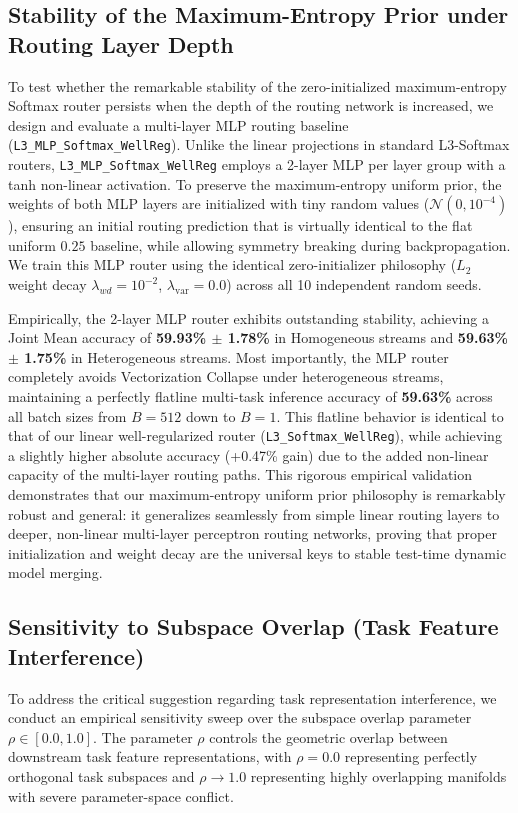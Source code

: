 \subsection{Stability of the Maximum-Entropy Prior under Routing Layer Depth}
\label{subsec:mlp_depth}
To test whether the remarkable stability of the zero-initialized maximum-entropy Softmax router persists when the depth of the routing network is increased, we design and evaluate a multi-layer MLP routing baseline (\texttt{L3\_MLP\_Softmax\_WellReg}). Unlike the linear projections in standard L3-Softmax routers, \texttt{L3\_MLP\_Softmax\_WellReg} employs a 2-layer MLP per layer group with a tanh non-linear activation. To preserve the maximum-entropy uniform prior, the weights of both MLP layers are initialized with tiny random values ($\mathcal{N}(0, 10^{-4})$), ensuring an initial routing prediction that is virtually identical to the flat uniform $0.25$ baseline, while allowing symmetry breaking during backpropagation. We train this MLP router using the identical zero-initializer philosophy ($L_2$ weight decay $\lambda_{wd}=10^{-2}$, $\lambda_{\text{var}}=0.0$) across all 10 independent random seeds.

Empirically, the 2-layer MLP router exhibits outstanding stability, achieving a Joint Mean accuracy of \textbf{59.93\% $\pm$ 1.78\%} in Homogeneous streams and \textbf{59.63\% $\pm$ 1.75\%} in Heterogeneous streams. Most importantly, the MLP router completely avoids Vectorization Collapse under heterogeneous streams, maintaining a perfectly flatline multi-task inference accuracy of \textbf{59.63\%} across all batch sizes from $B=512$ down to $B=1$. This flatline behavior is identical to that of our linear well-regularized router (\texttt{L3\_Softmax\_WellReg}), while achieving a slightly higher absolute accuracy (+0.47\% gain) due to the added non-linear capacity of the multi-layer routing paths. This rigorous empirical validation demonstrates that our maximum-entropy uniform prior philosophy is remarkably robust and general: it generalizes seamlessly from simple linear routing layers to deeper, non-linear multi-layer perceptron routing networks, proving that proper initialization and weight decay are the universal keys to stable test-time dynamic model merging.

\subsection{Sensitivity to Subspace Overlap (Task Feature Interference)}
To address the critical suggestion regarding task representation interference, we conduct an empirical sensitivity sweep over the subspace overlap parameter $\rho \in [0.0, 1.0]$. The parameter $\rho$ controls the geometric overlap between downstream task feature representations, with $\rho = 0.0$ representing perfectly orthogonal task subspaces and $\rho \to 1.0$ representing highly overlapping manifolds with severe parameter-space conflict. 

